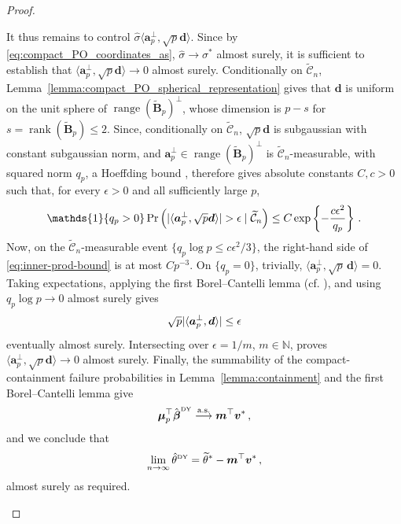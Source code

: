 \documentclass{article}
\makeatletter
\theoremstyle{definition}
\newcommand{\abs}[1]{%
	\ensuremath{%
		\if@display
		\left| #1 \right|
		\else
		\lvert #1 \rvert
		\fi
	}%
}
\newcommand*{\bb}{\boldsymbol}
\newcommand{\betady}{\ensuremath{\hat{\bbeta}^{\textrm{\tiny DY}}}}
\newcommand{\thetady}{\ensuremath{\hat{\theta}^{\textrm{\tiny DY}}}}
\def\bv{\bb{v}}
\def\bbeta{\bb{\beta}}
\newcommand{\rank}{\operatorname{rank}}
\newcommand{\range}{\operatorname{range}}
\makeatother
\begin{document}
\begin{bibunit}
\begin{proof}
\begin{enumerate}[label=(\roman{*})]
It thus remains to control $\hat \sigma \langle \bb a_p^\perp, \sqrt p \bb d \rangle$. Since by \eqref{eq:compact_PO_coordinates_as}, $\hat{\sigma} \to \sigma^*$ almost surely, it is sufficient to establish that $\langle \bb a_p^\perp, \sqrt p \bb d \rangle \to 0$ almost surely. 
Conditionally on $\widetilde{\mathcal C}_n$,
Lemma~\ref{lemma:compact_PO_spherical_representation} gives that $\bb d$ is
uniform on the unit sphere of $\range(\widetilde{\bb B}_p)^\perp$, whose
dimension is $p-s$ for $s=\rank(\widetilde{\bb B}_p)\leq2$. Since, conditionally on $\widetilde{\mathcal C}_n$, $\sqrt p \bb d$ is subgaussian
\citep[Theorem~3.4.6]{vershynin:2018} with constant subgaussian norm, and 
$\bb a_p^\perp \in \range(\widetilde{\bb B}_p)^\perp$ is $\widetilde{\mathcal C}_n$-measurable, with squared norm $q_p$, a Hoeffding bound \citep[Theorem~2.6.3]{vershynin:2018}, therefore gives absolute constants
$C,c>0$ such that, for every $\epsilon>0$ and all sufficiently large $p$,
\begin{equation}
    \label{eq:inner-prod-bound} 
        \mathds{1}\{q_p > 0 \} \Pr
    \left(
        \abs{
            \langle
                \bb a_p^\perp,
                \sqrt p \bb d
            \rangle
        }
        >
        \epsilon
        \mid
        \widetilde{\mathcal C}_n
    \right)
    \leq
    C
    \exp
    \left\{
        -
        \frac{c\epsilon^2}{q_p}
    \right\}\,. 
\end{equation}
Now, on the
$\widetilde{\mathcal C}_n$-measurable event
$\{q_p\log p\leq c\epsilon^2/3\}$, the right-hand side of \eqref{eq:inner-prod-bound} is at most
$Cp^{-3}$. 
On $\{q_p=0\}$, trivially, $\langle \bb a_p^\perp,\sqrt p\,\bb d \rangle = 0$. 
Taking expectations, applying the first Borel--Cantelli lemma
(cf. \citealt[p.~308]{shiryaev:2016}), and using
$q_p\log p\to0$ almost surely gives
$$
    \sqrt p
    \abs{
        \langle
            \bb a_p^\perp,
            \bb d
        \rangle
    }
    \leq
    \epsilon
$$
eventually almost surely. Intersecting over $\epsilon=1/m$,
$m\in\mathbb N$, proves $\langle \bb a_p^\perp , \sqrt p \bb d \rangle \to 0$ almost surely.
Finally, the summability of the compact-containment failure probabilities in
Lemma~\ref{lemma:containment} and the first Borel--Cantelli lemma give
$$
    \bb \mu_p^\top \betady \overset{\textrm{a.s.}}{\longrightarrow} \bb m^\top \bv^* \,,
$$
and we conclude that
$$
    \lim\limits_{n \to \infty} \thetady = \widetilde\theta^* - \bb m^\top \bv^* \,, 
$$
almost surely as required. 



\end{enumerate}
\end{proof}
\end{bibunit}
\end{document}

